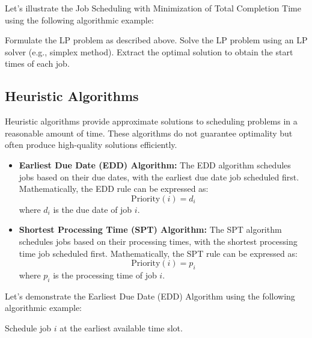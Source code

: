 \documentclass[12pt]{book} %
\begin{document}
Let's illustrate the Job Scheduling with Minimization of Total Completion Time using the following algorithmic example:
\FloatBarrier
\begin{algorithm}
\caption{LP-based Job Scheduling with Minimization of Total Completion Time}
\begin{algorithmic}[1]
\State Formulate the LP problem as described above.
\State Solve the LP problem using an LP solver (e.g., simplex method).
\State Extract the optimal solution to obtain the start times of each job.
\end{algorithmic}
\end{algorithm}
\FloatBarrier

\subsection{Heuristic Algorithms}

Heuristic algorithms provide approximate solutions to scheduling problems in a reasonable amount of time. These algorithms do not guarantee optimality but often produce high-quality solutions efficiently.

\begin{itemize}
    \item \textbf{Earliest Due Date (EDD) Algorithm:} The EDD algorithm schedules jobs based on their due dates, with the earliest due date job scheduled first. Mathematically, the EDD rule can be expressed as:
    \[ \text{Priority}(i) = d_i \]
    where \(d_i\) is the due date of job \(i\).
    
    \item \textbf{Shortest Processing Time (SPT) Algorithm:} The SPT algorithm schedules jobs based on their processing times, with the shortest processing time job scheduled first. Mathematically, the SPT rule can be expressed as:
    \[ \text{Priority}(i) = p_i \]
    where \(p_i\) is the processing time of job \(i\).
\end{itemize}

Let's demonstrate the Earliest Due Date (EDD) Algorithm using the following algorithmic example:
\FloatBarrier
\begin{algorithm}
\caption{Earliest Due Date (EDD) Algorithm}
\begin{algorithmic}[1]
\State Schedule job \(i\) at the earliest available time slot.
\EndFor
\end{algorithmic}
\end{algorithm}
\FloatBarrier
\end{document}
